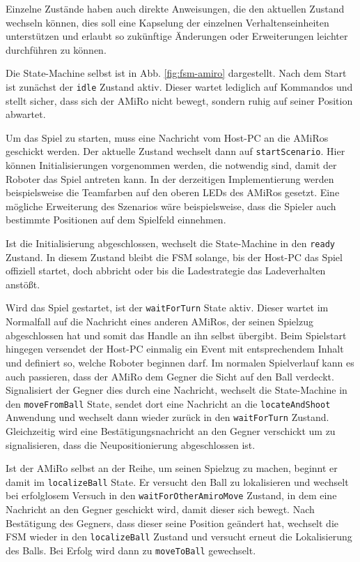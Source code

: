 Einzelne Zustände haben auch direkte Anweisungen, die den aktuellen Zustand wechseln können, dies soll eine Kapselung der einzelnen Verhaltenseinheiten unterstützen und erlaubt so zukünftige Änderungen oder Erweiterungen leichter durchführen zu können.

Die State-Machine selbst ist in Abb. \ref{fig:fsm-amiro} dargestellt. Nach dem Start ist zunächst der \texttt{idle} Zustand aktiv. Dieser wartet lediglich auf Kommandos und stellt sicher, dass sich der AMiRo nicht bewegt, sondern ruhig auf seiner Position abwartet.

Um das Spiel zu starten, muss eine Nachricht vom Host-PC an die AMiRos geschickt werden. Der aktuelle Zustand wechselt dann auf \texttt{startScenario}. Hier können Initialisierungen vorgenommen werden, die notwendig sind, damit der Roboter das Spiel antreten kann. In der derzeitigen Implementierung werden beispielsweise die Teamfarben auf den oberen LEDs des AMiRos gesetzt. Eine mögliche Erweiterung des Szenarios wäre beispielsweise, dass die Spieler auch bestimmte Positionen auf dem Spielfeld einnehmen.

Ist die Initialisierung abgeschlossen, wechselt die State-Machine in den \texttt{ready} Zustand. In diesem Zustand bleibt die FSM solange, bis der Host-PC das Spiel offiziell startet, doch abbricht oder bis die Ladestrategie das Ladeverhalten anstößt.

Wird das Spiel gestartet, ist der \texttt{waitForTurn} State aktiv. Dieser wartet im Normalfall auf die Nachricht eines anderen AMiRos, der seinen Spielzug abgeschlossen hat und somit das Handle an ihn selbst übergibt. Beim Spielstart hingegen versendet der Host-PC einmalig ein Event mit entsprechendem Inhalt und definiert so, welche Roboter beginnen darf. Im normalen Spielverlauf kann es auch passieren, dass der AMiRo dem Gegner die Sicht auf den Ball verdeckt. Signalisiert der Gegner dies durch eine Nachricht, wechselt die State-Machine in den \texttt{moveFromBall} State, sendet dort eine Nachricht an die \texttt{locateAndShoot} Anwendung und wechselt dann wieder zurück in den \texttt{waitForTurn} Zustand. Gleichzeitig wird eine Bestätigungsnachricht an den Gegner verschickt um zu signalisieren, dass die Neupositionierung abgeschlossen ist.

Ist der AMiRo selbst an der Reihe, um seinen Spielzug zu machen, beginnt er damit im \texttt{localizeBall} State. Er versucht den Ball zu lokalisieren und wechselt bei erfolglosem Versuch in den \texttt{waitForOtherAmiroMove} Zustand, in dem eine Nachricht an den Gegner geschickt wird, damit dieser sich bewegt. Nach Bestätigung des Gegners, dass dieser seine Position geändert hat, wechselt die FSM wieder in den \texttt{localizeBall} Zustand und versucht erneut die Lokalisierung des Balls. Bei Erfolg wird dann zu \texttt{moveToBall} gewechselt.

